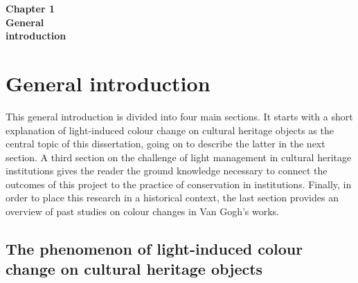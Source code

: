 
\newcommand{\HRule}{\rule{\linewidth}{0.5mm}} 	%



\pagecolor{mygray}

\begin{titlepage}
   \begin{center}
       \vspace*{3cm}
       {\fontsize{40pt}{46pt}\selectfont \textbf{Chapter 1}}\\       
       \vspace*{3cm}
       {\fontsize{30pt}{36pt}\selectfont \textbf{General} \\[1cm] 
        \fontsize{30pt}{36pt}\selectfont \textbf{introduction}} \\           
   \end{center}
\end{titlepage}


\pagecolor{white}
\restoregeometry


\chapter{ General introduction}
\label{ch:ch1_general-intro}

This general introduction is divided into four main sections. It starts with a short explanation of light-induced colour change on cultural heritage objects as the central topic of this dissertation, going on to describe the latter in the next section. A third section on the challenge of light management in cultural heritage institutions gives the reader the ground knowledge necessary to connect the outcomes of this project to the practice of conservation in institutions. Finally, in order to place this research in a historical context, the last section provides an overview of past studies on colour changes in Van Gogh's works. \\




\section{The phenomenon of light-induced colour change on cultural heritage objects}


